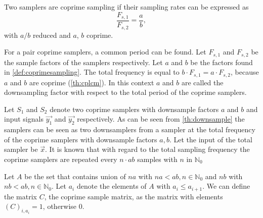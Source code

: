 \documentclass[a4paper, openany, oneside]{memoir}
\begin{document}
\begin{blockDefinition}
\label{def:coprimesampling}
    Two samplers are coprime sampling if their sampling rates can be expressed as
    \begin{equation*}
        \frac{F_{s,1}}{F_{s,2}} = \frac{a}{b},
        \end{equation*}
        with $a/b$ reduced and $a$, $b$ coprime.
    \end{blockDefinition}

    \begin{blockTheorem}\label{th:downsample}
    For a pair coprime samplers, a common period can be found. Let $F_{s,1}$ and $F_{s,2}$ be the sample factors of the samplers respectively. Let $a$ and $b$ be the factors found in \cref{def:coprimesampling}. The total frequency is equal to $b \cdot F_{s,1} = a \cdot F_{s,2}$, because $a$ and $b$ are coprime (\cref{th:cplcm}). In this context $a$ and $b$ are called the downsampling factor with respect to the total period of the coprime samplers.
\end{blockTheorem}

Let $S_1$ and $S_2$ denote two coprime samplers with downsample factors $a$ and $b$ and input signals $\vec{y_1}$ and $\vec{y_2}$ respectively. As can be seen from \cref{th:downsample} the samplers can be seen as two downsamplers from a sampler at the total frequency of the coprime samplers with downsample factors $a, b$. Let the input of the total sampler be $\vec{x}$. It is known that with regard to the total sampling frequency the coprime samplers are repeated every $n\cdot ab$ samples with $n$ in $\mathbb{N}_0$

Let $A$ be the set that contains union of $na$ with $n a < ab, n \in \mathbb{N}_0$ and $n b$ with $n b < ab, n \in \mathbb{N}_0$. Let $a_i$ denote the elements of $A$ with $a_i \leq a_{i+1}$. We can define the matrix $C$, the coprime sample matrix, as the matrix with elements $(C)_{i,a_i} = 1$, otherwise $0$.
\end{document}
